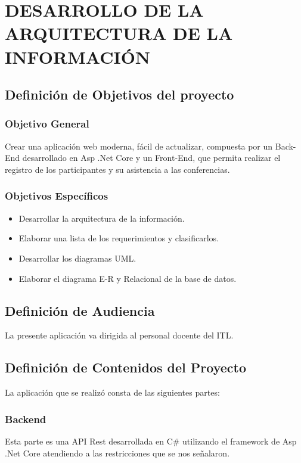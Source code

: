 \chapter{DESARROLLO DE LA ARQUITECTURA DE LA INFORMACIÓN}

\section{Definición de Objetivos del proyecto}
\subsection{Objetivo General}

Crear una aplicación web moderna, fácil de actualizar, compuesta por un Back-End desarrollado en Asp .Net Core y un Front-End, que permita realizar el registro de los participantes y su asistencia a las conferencias.

\subsection{Objetivos Específicos}
 
\begin{itemize}
	\item Desarrollar la arquitectura de la información.
	\item Elaborar una lista de los requerimientos y clasificarlos.
	\item Desarrollar los diagramas UML.
	\item Elaborar el diagrama E-R y Relacional de la base de datos.
\end{itemize}

\section{Definición de Audiencia}
La presente aplicación va dirigida al personal docente del ITL.

\section{Definición de Contenidos del Proyecto}
La aplicación que se realizó consta de las siguientes partes:
\subsection{Backend}
	Esta parte es una API Rest desarrollada en C\# utilizando el framework de Asp .Net Core atendiendo a las restricciones que se nos señalaron. 
	
